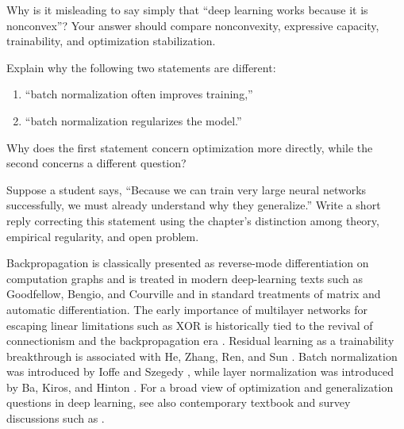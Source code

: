 \begin{exercise}
Why is it misleading to say simply that ``deep learning works because it is nonconvex''?
Your answer should compare nonconvexity, expressive capacity, trainability, and optimization stabilization.
\end{exercise}

\begin{exercise}
Explain why the following two statements are different:
\begin{enumerate}
    \item ``batch normalization often improves training,''
    \item ``batch normalization regularizes the model.''
\end{enumerate}
Why does the first statement concern optimization more directly, while the second concerns a different question?
\end{exercise}

\begin{exercise}
Suppose a student says, ``Because we can train very large neural networks successfully, we must already understand why they generalize.''
Write a short reply correcting this statement using the chapter's distinction among theory, empirical regularity, and open problem.
\end{exercise}

\notesandreferences

Backpropagation is classically presented as reverse-mode differentiation on computation graphs and is treated in modern deep-learning texts such as Goodfellow, Bengio, and Courville \cite{goodfellow2016deep} and in standard treatments of matrix and automatic differentiation. The early importance of multilayer networks for escaping linear limitations such as XOR is historically tied to the revival of connectionism and the backpropagation era \cite{rumelhart1986learning}. Residual learning as a trainability breakthrough is associated with He, Zhang, Ren, and Sun \cite{he2016deep}. Batch normalization was introduced by Ioffe and Szegedy \cite{ioffe2015batch}, while layer normalization was introduced by Ba, Kiros, and Hinton \cite{ba2016layer}. For a broad view of optimization and generalization questions in deep learning, see also contemporary textbook and survey discussions such as \cite{goodfellow2016deep,zhang2021understanding}.
